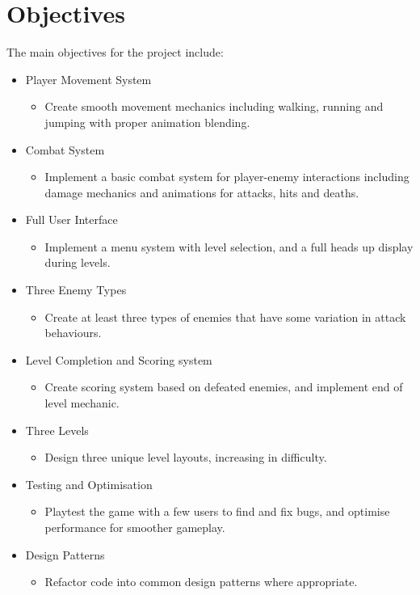 \documentclass[10pt]{final_report}
\begin{document}
\section{Objectives}\label{objectives}
The main objectives for the project include:
\begin{itemize}
    \item Player Movement System
    \begin{itemize}
	\item{Create smooth movement mechanics including walking, running and jumping with proper animation blending.}
    \end{itemize}
    \item Combat System
    \begin{itemize}
	\item{Implement a basic combat system for player-enemy interactions including damage mechanics and animations for attacks, hits and deaths.}
    \end{itemize}
    \item Full User Interface
    \begin{itemize}
	\item{Implement a menu system with level selection, and a full heads up display during levels.}
    \end{itemize}
    \item Three Enemy Types
    \begin{itemize}
	\item{Create at least three types of enemies that have some variation in attack behaviours.}
    \end{itemize}
    \item Level Completion and Scoring system
    \begin{itemize}
	\item{Create scoring system based on defeated enemies, and implement end of level mechanic.}
    \end{itemize}
    \item Three Levels
    \begin{itemize}
	\item{Design three unique level layouts, increasing in difficulty.}
    \end{itemize}
    \item Testing and Optimisation
    \begin{itemize}
	\item{Playtest the game with a few users to find and fix bugs, and optimise performance for smoother gameplay.}
    \end{itemize}
    \item Design Patterns
    \begin{itemize}
	\item{Refactor code into common design patterns where appropriate.}
    \end{itemize}
\end{itemize}
\end{document}
